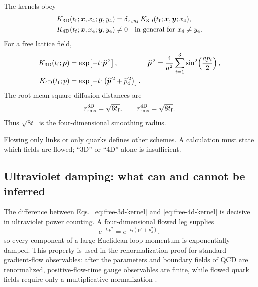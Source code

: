 \documentclass[11pt]{article}
\numberwithin{equation}{section}
\newcommand{\tf}{t_{\mathrm f}}
\begin{document}
The kernels obey
\begin{align}
  K_{\rm 3D}
  (\tf;\bm x,x_4;\bm y,y_4)
  &=
  \delta_{x_4y_4}\,
  K_{\rm 3D}(\tf;\bm x,\bm y;x_4),
  \label{eq:3d-time-diagonal-kernel}
  \\
  K_{\rm 4D}
  (\tf;\bm x,x_4;\bm y,y_4)
  &\neq 0
  \quad\text{in general for }x_4\neq y_4 .
  \label{eq:4d-time-mixing-kernel}
\end{align}
For a free lattice field,
\begin{align}
  K_{\rm 3D}(\tf;\bm p)
  &=
  \exp\!\left[-\tf\widehat{\bm p}^{\,2}\right],
  &
  \widehat{\bm p}^{\,2}
  &=
  \frac{4}{a^2}
  \sum_{i=1}^{3}\sin^2\!\left(\frac{ap_i}{2}\right),
  \label{eq:free-3d-kernel}
  \\
  K_{\rm 4D}(\tf;p)
  &=
  \exp\!\left[
    -\tf\left(\widehat{\bm p}^{\,2}+\widehat p_4^{\,2}\right)
  \right].
  \label{eq:free-4d-kernel}
\end{align}
The root-mean-square diffusion distances are
\begin{equation}
  r_{\rm rms}^{\rm 3D}=\sqrt{6\tf},
  \qquad
  r_{\rm rms}^{\rm 4D}=\sqrt{8\tf}.
  \label{eq:3d-4d-radii}
\end{equation}
Thus \(\sqrt{8\tf}\) is the four-dimensional smoothing radius.

Flowing only links or only quarks defines other schemes. A calculation must
state which fields are flowed; ``3D'' or ``4D'' alone is insufficient.

\subsection{Ultraviolet damping: what can and cannot be inferred}

The difference between Eqs.~\eqref{eq:free-3d-kernel} and
\eqref{eq:free-4d-kernel} is decisive in ultraviolet power counting.  A
four-dimensional flowed leg supplies
\begin{equation}
  e^{-\tf p^2}
  =e^{-\tf(\bm p^2+p_4^2)},
\end{equation}
so every component of a large Euclidean loop momentum is exponentially
damped.  This property is used in the renormalization proof for standard
gradient-flow observables: after the parameters and boundary fields of QCD
are renormalized, positive-flow-time gauge observables are finite, while
flowed quark fields require only a multiplicative normalization
\cite{LuscherWeisz2011,Luscher2013}.
\end{document}
